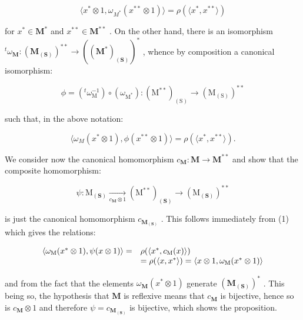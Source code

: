 \[
\langle x ^ {*} \otimes 1, \omega_ {M ^ {*}} (x ^ {* *} \otimes 1) \rangle = \rho (\langle x ^ {*}, x ^ {* *} \rangle)
\]

for \(x^{*} \in \mathbf{M}^{*}\) and \(x^{**} \in \mathbf{M}^{**}\) . On the other hand, there is an isomorphism \(^t\omega_{\mathbf{M}}: (\mathbf{M}_{(\mathbf{S})})^{**} \to ((\mathbf{M}^{*})_{(\mathbf{S})})^{*}\) , whence by composition a canonical isomorphism:

\[
\phi = \left(^ {t} \omega_ {\mathrm{M}} ^ {- 1}\right) \circ (\omega_ {\mathrm{M} ^ {*}}): (\mathrm{M} ^ {* *}) _ {(\mathrm{S})} \rightarrow (\mathrm{M} _ {(\mathrm{S})}) ^ {* *}
\]

such that, in the above notation:

\[
\langle \omega_ {M} (x ^ {*} \otimes 1), \phi (x ^ {* *} \otimes 1) \rangle = \rho (\langle x ^ {*}, x ^ {* *} \rangle).\tag{1}
\]

We consider now the canonical homomorphism \(c_{\mathbf{M}}: \mathbf{M} \to \mathbf{M}^{**}\) and show that the composite homomorphism:

\[
\psi : \mathrm{M} _ {(\mathbf {S})} \xrightarrow [ c _ {\mathbf {M}} \otimes 1 ]{} (\mathrm{M} ^ {* *}) _ {(\mathbf {S})} \longrightarrow (\mathrm{M} _ {(\mathbf {S})}) ^ {* *}\tag{2}
\]

is just the canonical homomorphism \(c_{\mathbf{M}_{(\mathbf{S})}}\) . This follows immediately from (1) which gives the relations:

\[
\begin{array}{r l} \langle \omega_ {\mathrm{M}} (x ^ {*} \otimes 1), \psi (x \otimes 1) \rangle = & \rho (\langle x ^ {*}, c _ {\mathrm{M}} (x) \rangle) \\ & = \rho (\langle x, x ^ {*} \rangle) = \langle x \otimes 1, \omega_ {\mathrm{M}} (x ^ {*} \otimes 1) \rangle \end{array}
\]

and from the fact that the elements \(\omega_{\mathbf{M}}(x^{*}\otimes 1)\) generate \((\mathbf{M}_{(\mathbf{S})})^{*}\) . This being so, the hypothesis that \(\mathbf{M}\) is reflexive means that \(c_{\mathbf{M}}\) is bijective, hence so is \(c_{\mathbf{M}}\otimes 1\) and therefore \(\psi = c_{\mathbf{M}_{(\mathbf{S})}}\) is bijective, which shows the proposition.

